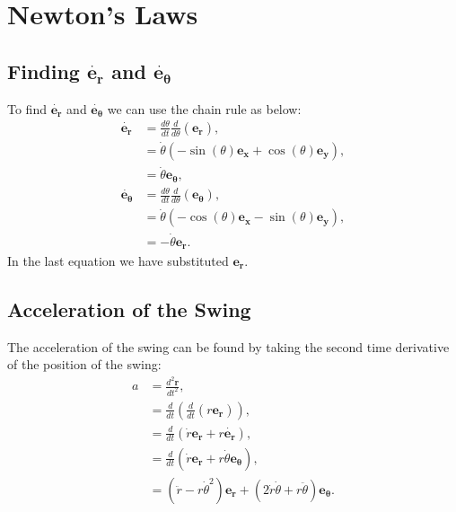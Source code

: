 \documentclass[12pt]{article}
\begin{document}



\appendix
\section{Newton's Laws}
\subsection{Finding $\dot{\mathbf{e_r}}$ and $\dot{\mathbf{e_\theta}}$}
To find $\dot{\mathbf{e_r}}$ and $\dot{\mathbf{e_\theta}}$ we can use the chain rule as below:
\begin{align}
    \dot{\mathbf{e_r}} &= \frac{d\theta}{dt} \frac{d}{d\theta}(\mathbf{e_r}),\\
    &= \dot{\theta}(-\sin(\theta) \mathbf{e_x} + \cos(\theta) \mathbf{e_y}),\\
    &= \dot{\theta}\mathbf{e_\theta},\\
    \dot{\mathbf{e_\theta}} &= \frac{d\theta}{dt} \frac{d}{d\theta}(\mathbf{e_\theta}),\\
    &= \dot{\theta} (-\cos(\theta) \mathbf{e_x} - \sin(\theta) \mathbf{e_y}),\\
    &= -\dot{\theta} \mathbf{e_r}.
\end{align}
In the last equation we have substituted $\mathbf{e_r}$.
\subsection{Acceleration of the Swing}
The acceleration of the swing can be found by taking the second time derivative of the position of the swing:
\begin{align}
    a &= \frac{d^2\mathbf{r}}{dt^2},\\
    &= \frac{d}{dt}(\frac{d}{dt}(r\mathbf{e_r})),\\
    &= \frac{d}{dt}(\dot{r} \mathbf{e_r} + r\mathbf{\dot{e_r}}),\\
    &= \frac{d}{dt}(\dot{r} \mathbf{e_r} + r\dot{\theta}\mathbf{e_\theta}),\\
    &= (\ddot{r} - r \dot{\theta}^2) \mathbf{e_r} + (2\dot{r} \dot{\theta} + r \ddot{\theta}) \mathbf{e_\theta}.
\end{align}
\end{document}
